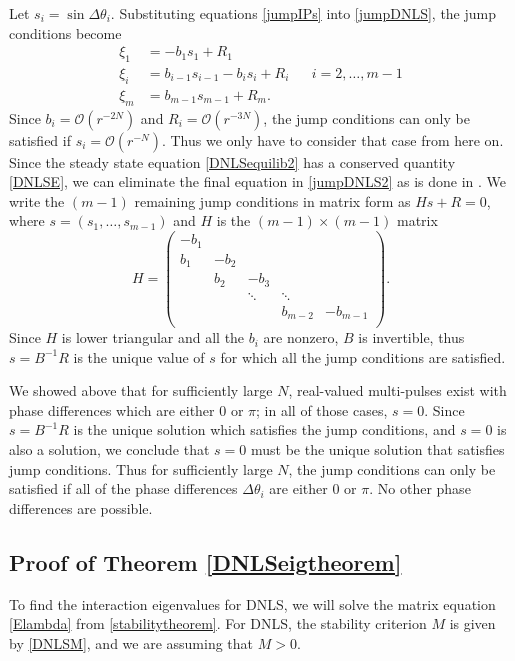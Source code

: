 \documentclass[12pt]{elsarticle}
\begin{document}
Let $s_i = \sin{\Delta\theta_i}$. Substituting equations \cref{jumpIPs} into \cref{jumpDNLS}, the jump conditions become
\begin{equation}\label{jumpDNLS2}
\begin{aligned}
\xi_1 &= -b_1 s_1 + R_1 \\
\xi_i &= b_{i-1} s_{i-1} - b_i s_i + R_i
&& i = 2, \dots, m-1 \\
\xi_m &= b_{m-1} s_{m-1} + R_m.
\end{aligned}
\end{equation}
Since $b_i = \mathcal{O}(r^{-2N})$ and $R_i = \mathcal{O}(r^{-3N})$, the jump conditions can only be satisfied if $s_i = \mathcal{O}(r^{-N})$. Thus we only have to consider that case from here on. Since the steady state equation \cref{DNLSequilib2} has a conserved quantity \cref{DNLSE}, we can eliminate the final equation in \cref{jumpDNLS2} as is done in \cite{SandstedeStrut}. We write the $(m-1)$ remaining jump conditions in matrix form as $H s + R = 0$, where $s = (s_1, \dots, s_{m-1})$ and $H$ is the $(m-1)\times(m-1)$ matrix
\[
H = \begin{pmatrix}
-b_1 \\
b_1 & -b_2 \\
& b_2 & -b_3 \\
&& \ddots & \ddots \\
&&& b_{m-2} & -b_{m-1} \\
\end{pmatrix}.
\]
Since $H$ is lower triangular and all the $b_i$ are nonzero, $B$ is invertible, thus $s = B^{-1}R$ is the unique value of $s$ for which all the jump conditions are satisfied. 

We showed above that for sufficiently large $N$, real-valued multi-pulses exist with phase differences which are either 0 or $\pi$; in all of those cases, $s = 0$. Since $s = B^{-1}R$ is the unique solution which satisfies the jump conditions, and $s = 0$ is also a solution, we conclude that $s = 0$ must be the unique solution that satisfies jump conditions. Thus for sufficiently large $N$, the jump conditions can only be satisfied if all of the phase differences $\Delta \theta_i$ are either 0 or $\pi$. No other phase differences are possible.

\subsection{Proof of Theorem \ref{DNLSeigtheorem}}

To find the interaction eigenvalues for DNLS, we will solve the matrix equation \cref{Elambda} from \cref{stabilitytheorem}. For DNLS, the stability criterion $M$ is given by \eqref{DNLSM}, and we are assuming that $M > 0$. 
\end{document}
